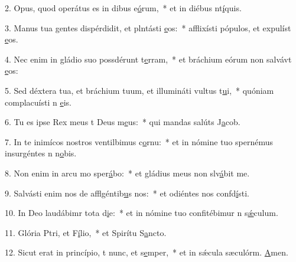 2. Opus, quod operátus es in dibus e\uline{ó}rum,~* et in diébus nt\uline{í}quis.\par 
3. Manus tua gentes dispérdidit, et plntásti \uline{e}os:~* afflixísti pópulos, et expulíst \uline{e}os.\par 
4. Nec enim in gládio suo possdérunt t\uline{e}rram,~* et bráchium eórum non salvávt \uline{e}os:\par 
5. Sed déxtera tua, et bráchium tuum, et illumináti vultus t\uline{u}i,~* quóniam complacuísti n \uline{e}is.\par 
6. Tu es ipse Rex meus t Deus m\uline{e}us:~* qui mandas salúts J\uline{a}cob.\par 
7. In te inimícos nostros ventilbimus c\uline{o}rnu:~* et in nómine tuo spernémus insurgéntes n n\uline{o}bis.\par 
8. Non enim in arcu mo sper\uline{á}bo:~* et gládius meus non slv\uline{á}bit me.\par 
9. Salvásti enim nos de afflgéntib\uline{u}s nos:~* et odiéntes nos confd\uline{í}sti.\par 
10. In Deo laudábimr tota d\uline{i}e:~* et in nómine tuo confitébimur n s\uline{ǽ}culum.\par 
11. Glória Ptri, et F\uline{í}lio,~* et Spirítu S\uline{a}ncto.\par 
12. Sicut erat in princípio, t nunc, et s\uline{e}mper,~* et in sǽcula sæculórm. \uline{A}men.\par 
